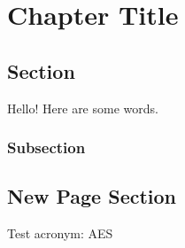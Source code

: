 \chapter{Chapter Title}

\section{Section}

Hello! Here are some words.

\subsection{Subsection}

\clearpage

\section{New Page Section}

Test acronym: \ac{AES}
